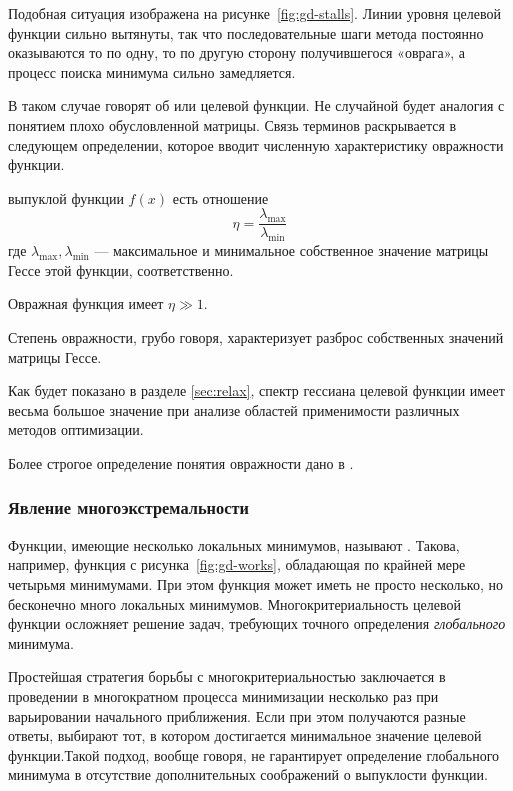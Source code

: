 Подобная ситуация изображена на рисунке \ref{fig:gd-stalls}. Линии
уровня целевой функции сильно вытянуты, так что последовательные шаги
метода \gd{} постоянно оказываются то по одну, то по другую сторону
получившегося «оврага», а процесс поиска минимума сильно замедляется.

В таком случае говорят об  или  целевой функции. Не случайной будет аналогия с
понятием плохо обусловленной матрицы. Связь терминов раскрывается в
следующем определении, которое вводит численную характеристику
овражности функции.

\begin{dfn}
  \label{dfn:ill-cond}
   выпуклой функции $f(x)$ есть отношение
  \begin{equation}
    \label{eq:gully}
    \eta = \frac{\lambda_{\max}}{\lambda_{\min}}
  \end{equation}
  где $\lambda_{\max}, \lambda_{\min}$ — максимальное и минимальное
  собственное значение матрицы Гессе этой функции, соответственно.
\end{dfn}

Овражная функция имеет $\eta \gg 1$.

Степень овражности, грубо говоря, характеризует разброс собственных
значений матрицы Гессе. 

Как будет показано в разделе \ref{sec:relax}, спектр гессиана целевой
функции имеет весьма большое значение при анализе областей
применимости различных методов оптимизации.

Более строгое определение понятия овражности дано в
\cite{chernorutsky04}.

\subsubsection{Явление многоэкстремальности}
\label{sec:problems-multiextr}

Функции, имеющие несколько локальных минимумов, называют
. Такова, например, функция с
рисунка \ref{fig:gd-works}, обладающая по крайней мере четырьмя
минимумами. При этом функция может иметь не просто несколько, но
бесконечно много локальных минимумов. Многокритериальность целевой
функции осложняет решение задач, требующих точного определения
\emph{глобального} минимума.

Простейшая стратегия борьбы с многокритериальностью заключается в
проведении в многократном процесса минимизации несколько раз при
варьировании начального приближения. Если при этом получаются разные
ответы, выбирают тот, в котором достигается минимальное значение
целевой функции.Такой подход, вообще говоря, не гарантирует
определение глобального минимума в отсутствие дополнительных
соображений о выпуклости функции.
